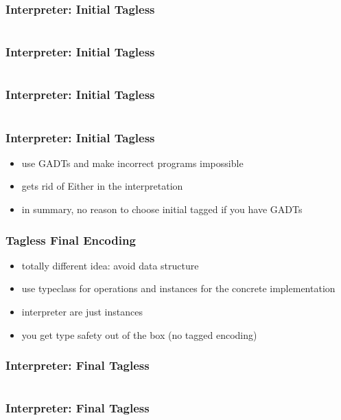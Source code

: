 \documentclass[aspectratio=169, hyperref={colorlinks, linkcolor=beamer@centricgreen}, urlcolor=links]{beamer}
\begin{document}
\begin{frame}[fragile]
  \frametitle{Interpreter: Initial Tagless}
  \inputminted[fontsize=\footnotesize]{scala}{snippets/initial-tagless-sample.scala}
\end{frame}

\begin{frame}[fragile]
  \frametitle{Interpreter: Initial Tagless}
  \inputminted[fontsize=\footnotesize]{scala}{snippets/initial-tagless-interp.scala}
\end{frame}

\begin{frame}[fragile]
  \frametitle{Interpreter: Initial Tagless}
  \inputminted[fontsize=\footnotesize]{scala}{snippets/initial-tagless-add.scala}
\end{frame}

\begin{frame}
  \frametitle{Interpreter: Initial Tagless}
  \begin{itemize}
  \item use GADTs and make incorrect programs impossible
  \item gets rid of Either in the interpretation
  \item in summary, no reason to choose initial tagged if you have GADTs
  \end{itemize}
\end{frame}

\begin{frame}
  \frametitle{Tagless Final Encoding}
  \begin{itemize}
  \item totally different idea: avoid data structure
  \item use typeclass for operations and instances for the concrete implementation
  \item interpreter are just instances
  \item you get type safety out of the box (no tagged encoding)
  \end{itemize}
\end{frame}

\begin{frame}[fragile]
  \frametitle{Interpreter: Final Tagless}
  \inputminted[fontsize=\footnotesize]{scala}{snippets/final-tagless-expr.scala}
\end{frame}

\begin{frame}[fragile]
  \frametitle{Interpreter: Final Tagless}
  \inputminted[fontsize=\footnotesize]{scala}{snippets/final-tagless-sample.scala}
\end{frame}
\end{document}
